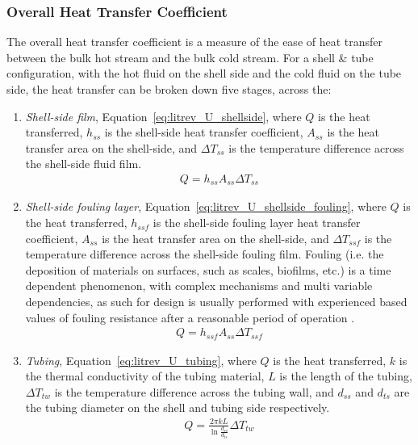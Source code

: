     \subsubsection{Overall Heat Transfer Coefficient}
    The overall heat transfer coefficient is a measure of the ease of heat transfer between the bulk hot stream and the bulk cold stream. For a shell \& tube configuration, with the hot fluid on the shell side and the cold fluid on the tube side, the heat transfer can be broken down five stages, across the:
    
    \begin{enumerate}
        \item  \emph{Shell-side film}, Equation~\ref{eq:litrev_U_shellside}, where \(Q\) is the heat transferred, \(h_{ss}\) is the shell-side heat transfer coefficient, \(A_{ss}\) is the heat transfer area on the shell-side, and \(\Delta T_{ss}\) is the temperature difference across the shell-side fluid film.
            \begin{align}
                Q = h_{ss}A_{ss}\Delta T_{ss} \label{eq:litrev_U_shellside}
            \end{align}
        \item \emph{Shell-side fouling layer}, Equation~\ref{eq:litrev_U_shellside_fouling}, where \(Q\) is the heat transferred, \(h_{ssf}\) is the shell-side fouling layer heat transfer coefficient, \(A_{ss}\) is the heat transfer area on the shell-side, and \(\Delta T_{ssf}\) is the temperature difference across the shell-side fouling film. Fouling (i.e. the deposition of materials on surfaces, such as scales, biofilms, etc.) is a time dependent phenomenon, with complex mechanisms and multi variable dependencies, as such for design is usually performed with experienced based values of fouling resistance after a reasonable period of operation \cite{Smith2005}.     
            \begin{align}
                Q = h_{ssf}A_{ss}\Delta T_{ssf} \label{eq:litrev_U_shellside_fouling}
            \end{align}
        \item \emph{Tubing}, Equation~\ref{eq:litrev_U_tubing}, where \(Q\) is the heat transferred, \(k\) is the thermal conductivity of the tubing material, \(L\) is the length of the tubing, \(\Delta T_{tw}\) is the temperature difference across the tubing wall, and \(d_{ss}\) and \(d_{ts}\) are the tubing diameter on the shell and tubing side respectively.
            \begin{align}
                Q = \frac{2\pi kL}{\ln \frac{d_{ss}}{d_{ts}}}\Delta T_{tw} \label{eq:litrev_U_tubing}

\end{align}
\end{enumerate}
